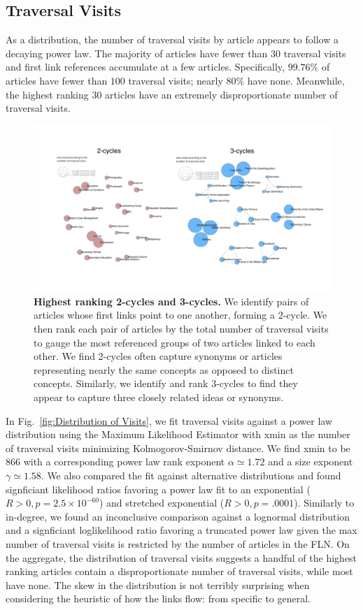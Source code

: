 \documentclass[pre,twocolumn,twoside,superscriptaddress,floatfix]{revtex4-1}
\begin{document}
{\subsection{Traversal Visits}

As a distribution, the number of traversal visits by article appears to follow a decaying power law. 
The majority of articles have fewer than 30 traversal visits and
first link references accumulate at a few articles.
Specifically, $99.76\%$ of articles have fewer than $100$ traversal visits; nearly $80\%$ have none. 
Meanwhile, the highest ranking 30 articles have an extremely disproportionate number of traversal visits.

\begin{figure}[tph!]
  \includegraphics[width=\textwidth]{fig010_2_and_3_cycles.pdf}
  \caption{
    \textbf{Highest ranking 2-cycles and 3-cycles.}
We identify pairs of articles whose first links point to one another, forming
a 2-cycle. We then rank each pair of articles by the total number of 
traversal visits to gauge the most referenced groups of two articles linked
to each other. We find 2-cycles often capture synonyms or articles representing nearly the 
same concepts as opposed to distinct concepts. Similarly, we identify and 
rank 3-cycles to find they appear to capture three closely related ideas or synonyms.}
  \label{fig:cycles}
\end{figure}
In Fig.~\ref{fig:Distribution of Visits}, we fit traversal visits against a power law distribution using the Maximum Likelihood Estimator with xmin as the number of traversal visits minimizing Kolmogorov-Smirnov distance. We find xmin to be 866 with a corresponding power law rank exponent $\alpha \simeq 1.72$ and a size exponent $\gamma \simeq 1.58$.
We also compared the fit against alternative distributions and found signficiant likelihood ratios favoring a power law fit to an exponential ($R>0, p=2.5\times10^{-60}$) and stretched exponential ($R > 0, p=.0001$).
Similarly to in-degree, we found an inconclusive comparison against a lognormal distribution and a signficiant loglikelihood ratio favoring a truncated power law given the max number of traversal visits is restricted by the number of articles in the FLN. 
On the aggregate, the distribution of traversal visits suggests
a handful of the highest ranking articles contain a disproportionate number of traversal visits, while most have none. The skew in the distribution is not terribly surprising when considering the heuristic of how the links flow: from specific to general. 

}
\end{document}
